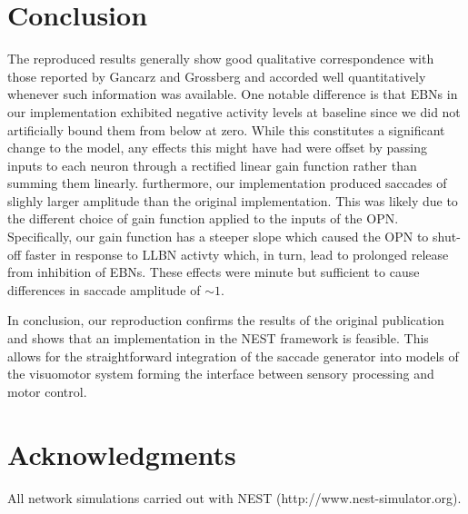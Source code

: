\documentclass[10pt,a4paper,onecolumn]{article}
\begin{document}
\section{Conclusion}\label{conclusion}

The reproduced results generally show good qualitative correspondence
with those reported by Gancarz and Grossberg \autocite{Gancarz1998} and
accorded well quantitatively whenever such information was available.
One notable difference is that EBNs in our implementation exhibited
negative activity levels at baseline since we did not artificially bound
them from below at zero. While this constitutes a significant change to
the model, any effects this might have had were offset by passing inputs
to each neuron through a rectified linear gain function rather than
summing them linearly. furthermore, our implementation produced saccades
of slighly larger amplitude than the original implementation. This was
likely due to the different choice of gain function applied to the
inputs of the OPN. Specifically, our gain function has a steeper slope
which caused the OPN to shut-off faster in response to LLBN activty
which, in turn, lead to prolonged release from inhibition of EBNs. These
effects were minute but sufficient to cause differences in saccade
amplitude of \(\sim1\)\textdegree.

In conclusion, our reproduction confirms the results of the original
publication and shows that an implementation in the NEST framework is
feasible. This allows for the straightforward integration of the saccade
generator into models of the visuomotor system forming the interface
between sensory processing and motor control.

\section{Acknowledgments}\label{acknowledgments}

All network simulations carried out with NEST
(http://www.nest-simulator.org).

{\sffamily \small
  \printbibliography[title=References]
}
\end{document}
